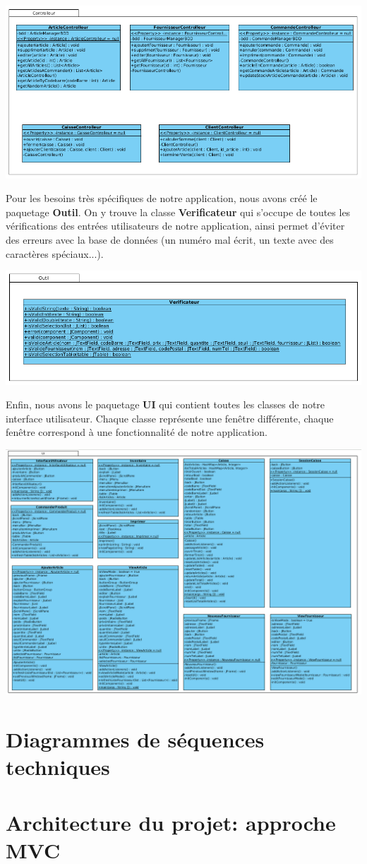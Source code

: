 \begin{center}
\includegraphics[width=14cm]{./Conception/controlleur}
\end{center}

Pour les besoins très spécifiques de notre application, nous avons créé le paquetage \textbf{Outil}. On y trouve la classe \textbf{Verificateur} qui s'occupe de toutes les vérifications des entrées utilisateurs de notre application, ainsi permet d'éviter des erreurs avec la base de données (un numéro mal écrit, un texte avec des caractères spéciaux...).

\begin{center}
\includegraphics[width=14cm]{./Conception/outil}
\end{center}

Enfin, nous avons le paquetage \textbf{UI} qui contient toutes les classes de notre interface utilisateur. Chaque classe représente une fenêtre différente, chaque fenêtre correspond à une fonctionnalité de notre application.

\begin{center}
\includegraphics[width=14cm]{./Conception/ui}
\end{center}


\section{Diagrammes de séquences techniques}

\section{Architecture du projet: approche MVC}